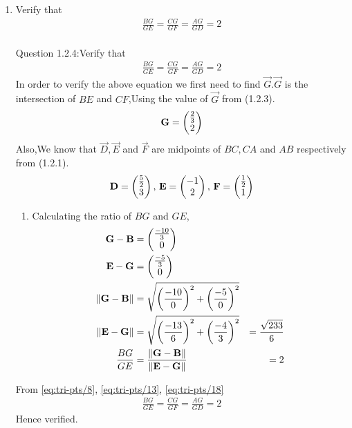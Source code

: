 \documentclass[11pt]{book}
\begin{document}
\begin{enumerate}[label=\thesection.\arabic*.,ref=\thesection.\theenumi]
\item Verify that 
		\begin{align}
			\frac{BG}{GE} = 
			\frac{CG}{GF} =
			\frac{AG}{GD} =2 
		\end{align}\\
Question 1.2.4:Verify that 
\begin{align}
		\frac{BG}{GE} = 
		\frac{CG}{GF} =
		\frac{AG}{GD} = 2 
\end{align}
\solution In order to verify the above equation we first need to find $\vec{G}$.$\vec{G}$ is the intersection of $BE$ and $CF$,Using the value of $\vec{G}$ from (1.2.3).
\begin{align}
		\mathbf{G} = \begin{pmatrix}\frac{2}{3}\\2\end{pmatrix}
\end{align}
Also,We know that $\vec{D}, \vec{E}$ and $\vec{F}$ are midpoints of $BC, CA$ and $AB$ respectively from (1.2.1).
\begin{align}
		\mathbf{D} = \begin{pmatrix}\frac{5}{2} \\ 3\end{pmatrix},\,
		\mathbf{E} = \begin{pmatrix}-1 \\ 2\end{pmatrix},\,
		\mathbf{F} = \begin{pmatrix}\frac{1}{2}\\ 1\end{pmatrix}
\end{align}
\begin{enumerate}
\item Calculating the ratio of $BG$ and $GE$,
\begin{align}
		\label{eq:tri-pts/4} \vec{G}-\vec{B} &= \myvec{\frac{-10}{3} \\ 0} \\
		\label{eq:tri-pts/5} \vec{E}-\vec{G} &= \myvec{\frac{-5}{3} \\ 0} \\
		\label{eq:tri-pts/6} \norm{\vec{G}-\vec{B}} &= \sqrt{\brak{\frac{-10}{0}}^2 + \brak{\frac{-5}{0}}^{2}}  \\
		\label{eq:tri-pts/7} \norm{\vec{E}-\vec{G}} &= \sqrt{\brak{\frac{-13}{6}}^2 + \brak{\frac{-4}{3}}^2} &= \frac{\sqrt{233}}{6} \\
		\label{eq:tri-pts/8}\frac{BG}{GE} &= \frac{\norm{\vec{G}-\vec{B}}}{\norm{\vec{E}-\vec{G}}}&= 2  
\end{align}		
\end{enumerate}

From \eqref{eq:tri-pts/8}, \eqref{eq:tri-pts/13}, \eqref{eq:tri-pts/18}
\begin{align}
		\frac{BG}{GE} = 
		\frac{CG}{GF} =
		\frac{AG}{GD} = 2
\end{align}
Hence verified.




\end{enumerate}
\end{document}
